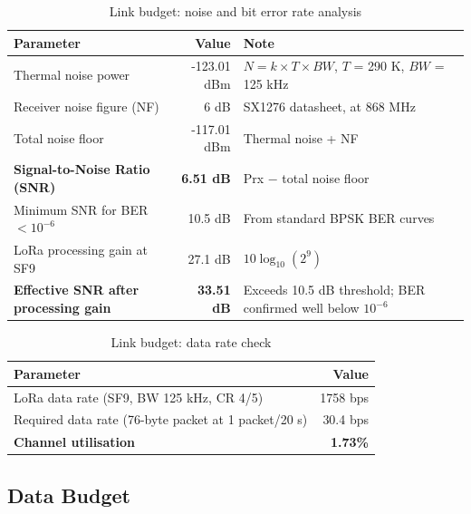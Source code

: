 \begin{table}[H]
\centering
\begin{tabular}{p{6.5cm}rp{5.5cm}}
\toprule
\textbf{Parameter} & \textbf{Value} & \textbf{Note} \\
\midrule
Thermal noise power & -123.01 dBm & $N = k \times T \times BW$, $T$ = 290 K, $BW$ = 125 kHz \\
Receiver noise figure (NF) & 6 dB & SX1276 datasheet, at 868 MHz \\
Total noise floor & -117.01 dBm & Thermal noise + NF \\
\midrule
\textbf{Signal-to-Noise Ratio (SNR)} & \textbf{6.51 dB} & Prx $-$ total noise floor \\
Minimum SNR for BER $<10^{-6}$ & 10.5 dB & From standard BPSK BER curves \\
LoRa processing gain at SF9 & 27.1 dB & $10 \log_{10}(2^9)$ \\
\midrule
\textbf{Effective SNR after processing gain} & \textbf{33.51 dB} & Exceeds 10.5 dB threshold; BER confirmed well below $10^{-6}$ \\
\bottomrule
\end{tabular}
\caption{Link budget: noise and bit error rate analysis}
\end{table}

\begin{table}[H]
\centering
\begin{tabular}{lr}
\toprule
\textbf{Parameter} & \textbf{Value} \\
\midrule
LoRa data rate (SF9, BW 125 kHz, CR 4/5) & 1758 bps \\
Required data rate (76-byte packet at 1 packet/20 s) & 30.4 bps \\
\midrule
\textbf{Channel utilisation} & \textbf{1.73\%} \\
\bottomrule
\end{tabular}
\caption{Link budget: data rate check}
\end{table}

\subsection{Data Budget}

